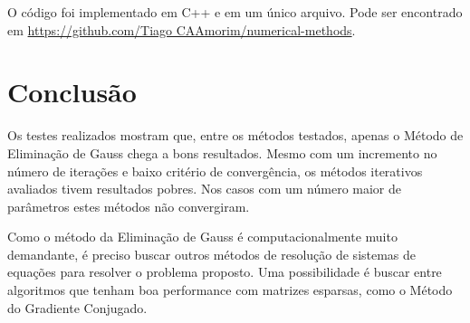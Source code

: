 \documentclass[final,5p]{elsarticle}
\numberwithin{equation}{section}
\begin{document}
        O código foi implementado em C++ e em um único arquivo. Pode ser encontrado em \href{https://github.com/TiagoCAAmorim/numerical-methods/blob/main/11_Jacobi_GS/11_Jacobi_GS.cpp}{https://github.com/Tiago CAAmorim/numerical-methods}.

\section{Conclusão}

            Os testes realizados mostram que, entre os métodos testados, apenas o Método de Eliminação de Gauss chega a bons resultados. Mesmo com um incremento no número de iterações e baixo critério de convergência, os métodos iterativos avaliados tivem resultados pobres. Nos casos com um número maior de parâmetros estes métodos não convergiram.

            Como o método da Eliminação de Gauss é computacionalmente muito demandante, é preciso buscar outros métodos de resolução de sistemas de equações para resolver o problema proposto. Uma possibilidade é buscar entre algoritmos que tenham boa performance com matrizes esparsas, como o Método do Gradiente Conjugado.



\appendix











\end{document}
